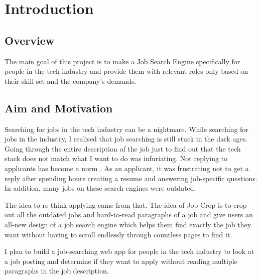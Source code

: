 
\chapter{Introduction} %

\label{Chapter1} %


\newcommand{\keyword}[1]{\textbf{#1}}
\newcommand{\tabhead}[1]{\textbf{#1}}
\newcommand{\code}[1]{\texttt{#1}}
\newcommand{\file}[1]{\texttt{\bfseries#1}}
\newcommand{\option}[1]{\texttt{\itshape#1}}


\section{Overview}
The main goal of this project is to make a Job Search Engine specifically for people in the tech industry and provide them with relevant roles only based on their skill set and the company's demands.

\section{Aim and Motivation}
Searching for jobs in the tech industry can be a nightmare. While searching for jobs in the industry, I realised that job searching is still stuck in the dark ages. Going through the entire description of the job just to find out that the tech stack does not match what I want to do was infuriating. Not replying to applicants has become a norm \parencite{Reference6}. As an applicant, it was frustrating not to get a reply after spending hours creating a resume and answering job-specific questions. In addition, many jobs on these search engines were outdated.

The idea to re-think applying came from that. The idea of Job Crop is to crop out all the outdated jobs and hard-to-read paragraphs of a job and give users an all-new design of a job search engine which helps them find exactly the job they want without having to scroll endlessly through countless pages to find it. 

I plan to build a job-searching web app for people in the tech industry to look at a job posting and determine if they want to apply without reading multiple paragraphs in the job description. 

